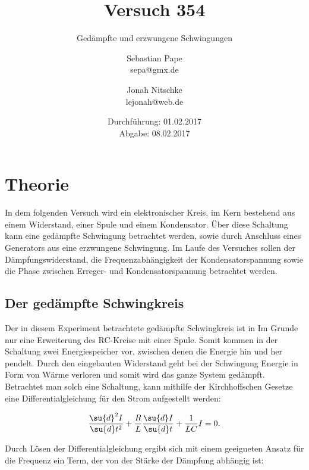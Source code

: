 

\title{Versuch 354}
\subtitle{Gedämpfte und erzwungene Schwingungen}
\author{Sebastian Pape\\
        sepa@gmx.de \and
        Jonah Nitschke\\
        lejonah@web.de}
\date{Durchführung: 01.02.2017\\
      Abgabe: 08.02.2017}



\maketitle
\newpage

\section{Theorie}

In dem folgenden Versuch wird ein elektronischer Kreis, im Kern bestehend aus einem
Widerstand, einer Spule und einem Kondensator. Über diese Schaltung kann eine
gedämpfte Schwingung betrachtet werden, sowie durch Anschluss eines Generators
aus eine erzwungene Schwingung. Im Laufe des Versuches sollen der Dämpfungswiderstand,
die Frequenzabhängigkeit der Kondensatorspannung sowie die Phase zwischen
Erreger- und Kondensatorspannung betrachtet werden.

\subsection{Der gedämpfte Schwingkreis}

Der in diesem Experiment betrachtete gedämpfte Schwingkreis ist in Im Grunde nur
eine Erweiterung des RC-Kreise mit einer Spule. Somit kommen in der Schaltung
zwei Energiespeicher vor, zwischen denen die Energie hin und her pendelt. Durch
den eingebauten Widerstand geht bei der Schwingung Energie in Form von Wärme verloren
und somit wird das ganze System gedämpft. Betrachtet man solch eine Schaltung, kann
mithilfe der Kirchhoffschen Gesetze eine Differentialgleichung für den Strom
aufgestellt werden:

\begin{equation}
  \frac{\su{d}^2I}{\su{d}t^2} + \frac{R}{L}\frac{\su{d}I}{\su{d}t} + \frac{1}{LC} I = 0 .
\end{equation}

Durch Lösen der Differentialgleichung ergibt sich mit einem geeigneten Ansatz für
die Frequenz ein Term, der von der Stärke der Dämpfung abhängig ist:

